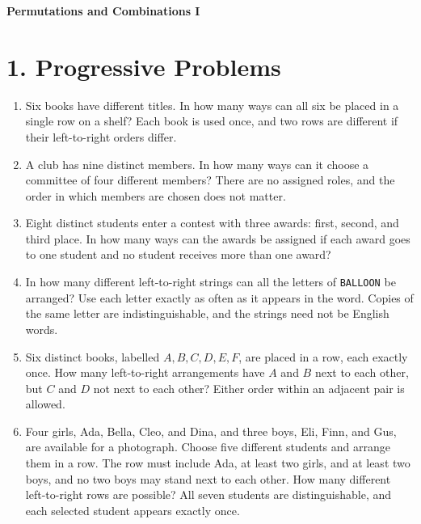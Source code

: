 \documentclass[12pt]{article}
\begin{document}
\begin{center}
  {\Large\bfseries Permutations and Combinations I}
\end{center}

\section*{1. Progressive Problems}

\begin{enumerate}[label=\textbf{\arabic*.}]
\item Six books have different titles. In how many ways can all six be
placed in a single row on a shelf? Each book is used once, and two rows
are different if their left-to-right orders differ.

\item A club has nine distinct members. In how many ways can it choose
a committee of four different members? There are no assigned roles, and
the order in which members are chosen does not matter.

\item Eight distinct students enter a contest with three awards: first,
second, and third place. In how many ways can the awards be assigned if
each award goes to one student and no student receives more than one award?

\item In how many different left-to-right strings can all the letters of
\texttt{BALLOON} be arranged? Use each letter exactly as often as it appears
in the word. Copies of the same letter are indistinguishable, and the
strings need not be English words.

\item Six distinct books, labelled $A,B,C,D,E,F$, are placed in a row,
each exactly once. How many left-to-right arrangements have $A$ and $B$
next to each other, but $C$ and $D$ not next to each other? Either order
within an adjacent pair is allowed.

\item Four girls, Ada, Bella, Cleo, and Dina, and three boys, Eli, Finn,
and Gus, are available for a photograph. Choose five different students
and arrange them in a row. The row must include Ada, at least two girls,
and at least two boys, and no two boys may stand next to each other.
How many different left-to-right rows are possible? All seven students
are distinguishable, and each selected student appears exactly once.
\end{enumerate}
\end{document}
